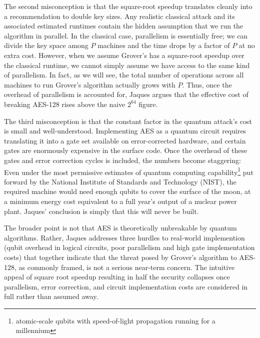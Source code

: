 The second misconception is that the square-root speedup translates cleanly into a recommendation to double key sizes. Any realistic classical attack and its associated estimated runtimes contain the hidden assumption that we run the algorithm in parallel. In the classical case, parallelism is essentially free; we can divide the key space among $P$ machines and the time drops by a factor of $P$ at no extra cost. However, when we assume Grover's has a square-root speedup over the classical runtime, we cannot simply assume we have access to the same kind of parallelism. In fact, as we will see, the total number of operations across all machines to run Grover's algorithm actually grows with $P$. Thus, once the overhead of parallelism is accounted for, Jaques argues that the effective cost of breaking AES-128 rises above the naive $2^{64}$ figure.

The third misconception is that the constant factor in the quantum attack's cost is small and well-understood. Implementing AES as a quantum circuit requires translating it into a gate set available on error-corrected hardware, and certain gates are enormously expensive in the surface code. Once the overhead of these gates and error correction cycles is included, the numbers become staggering: Even under the most permissive estimates of quantum computing capability\footnote{atomic-scale qubits with speed-of-light propagation running for a millennium} put forward by the National Institute of Standards and Technology (NIST), the required machine would need enough qubits to cover the surface of the moon, at a minimum energy cost equivalent to a full year's output of a nuclear power plant. Jaques' conclusion is simply that this will never be built.

The broader point is not that AES is theoretically unbreakable by quantum algorithms. Rather, Jaques addresses three hurdles to real-world implemention (qubit overhead in logical circuits, poor parallelism and high gate implementation costs) that together indicate that the threat posed by Grover's algorithm to AES-128, as commonly framed, is not a serious near-term concern. The intuitive appeal of square root speedup resulting in half the security collapses once parallelism, error correction, and circuit implementation costs are considered in full rather than assumed away.

